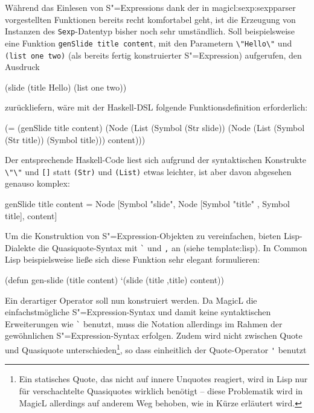 \documentclass[12pt, a4paper, bibgerm]{scrbook}
\newenvironment{DIFnomarkup}{}{}
\newcommand\icode[1]{\lstinline?#1?}
\newcommand\sref{}
\newcommand{\sees}[1]{(siehe \sref{#1})}
\newcommand{\sexp}{S"=Expression}
\newcommand{\sexps}{S"=Expressions}
\begin{document}
Während das Einlesen von \sexps{} dank der in
\sref{magicl:sexp:sexpparser} vorgestellten Funktionen bereits recht
komfortabel geht, ist die Erzeugung von Instanzen des
\icode{Sexp}-Datentyp bisher noch sehr umständlich. Soll beispielsweise eine
Funktion \icode{genSlide title content}, mit den Parametern
\icode{\"Hello\"} und \icode{(list one two)} (als bereits fertig
konstruierter \sexp{}) aufgerufen, den Ausdruck
\begin{DIFnomarkup}\begin{code}
(slide (title Hello) (list one two))
\end{code}\end{DIFnomarkup}
zurückliefern, wäre mit der Haskell-DSL folgende Funktionsdefinition
erforderlich:
\begin{DIFnomarkup}\begin{code}
(= (genSlide title content)
   (Node (List (Symbol (Str slide))
               (Node (List (Symbol (Str title)) (Symbol title)))
               content)))
\end{code}\end{DIFnomarkup}
Der entsprechende Haskell-Code liest sich aufgrund der syntaktischen
Konstrukte \icode{\"\"} und \icode{[]} statt \icode{(Str)} und
\icode{(List)} etwas leichter, ist aber davon abgesehen genauso komplex:
\begin{DIFnomarkup}\begin{code}
genSlide title content =
   Node [Symbol "slide",
         Node [Symbol "title" , Symbol title],
         content]
\end{code}\end{DIFnomarkup}
Um die Konstruktion von \sexp{}-Objekten zu vereinfachen, bieten
Lisp-Dialekte die Quasiquote-Syntax mit \icode{`} und \icode{,} an
\sees{template:lisp}. In Common Lisp beispielsweise ließe sich diese
Funktion sehr elegant formulieren:
\begin{DIFnomarkup}\begin{code}
(defun gen-slide (title content)
  `(slide (title ,title) content))
\end{code}\end{DIFnomarkup}
Ein derartiger Operator soll nun konstruiert werden. Da MagicL die
einfachstmögliche \sexp{}-Syntax und damit keine syntaktischen
Erweiterungen wie \icode{`} benutzt, muss die Notation allerdings im
Rahmen der gewöhnlichen \sexp{}-Syntax erfolgen. Zudem wird nicht
zwischen Quote und Quasiquote unterschieden\footnote{Ein statisches
  Quote, das nicht auf innere Unquotes reagiert, wird in Lisp nur für
  verschachtelte Quasiquotes wirklich benötigt -- diese Problematik wird
  in MagicL allerdings auf anderem Weg behoben, wie in Kürze erläutert
  wird.}, so dass einheitlich der Quote-Operator \icode{'} benutzt
\end{document}
